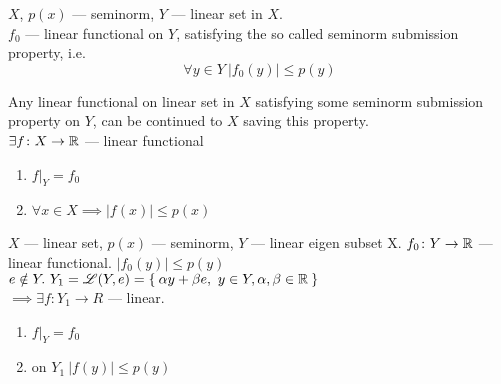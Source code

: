 $X$, $p(x)$ --- seminorm, $Y$ --- linear set in $X$. \\
$f_0$ --- linear functional on $Y$, satisfying the so called 
seminorm submission property, i.e. 
\[
  \forall y \in Y\ |f_0(y)| \leq p(y)
\]

\begin{thm}
  Any linear functional on linear set in $X$ satisfying some
  seminorm submission property on $Y$, can be continued to $X$ saving this
  property. \\
  $\exists f\colon X \to \mathbb{R}$ --- linear functional
  \begin{enumerate}
  \item $f|_Y = f_0$
  \item $\forall x \in X \implies |f(x)| \leq p(x)$
  \end{enumerate}
\end{thm}

\begin{lemma}[Banach]
  $X$ --- linear set, $p(x)$ --- seminorm, $Y$ --- linear eigen subset X.
  $f_0 \colon Y \to \mathbb{R}$ --- linear functional. $|f_0(y)| \leq p(y)$ \\
  $e \notin Y.\ Y_1 = \mathscr{L}(Y, e) = \Set{\alpha y + \beta e,\ y \in Y, \alpha,
    \beta \in \mathbb{R}}$ \\
  $\implies \exists f \colon Y_1 \to R$ --- linear.
  \begin{enumerate}
  \item $f|_Y = f_0$
  \item on $Y_1\ |f(y)| \leq p(y)$
  \end{enumerate}
\end{lemma}

